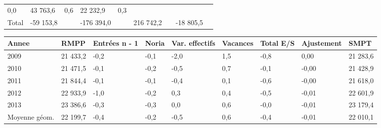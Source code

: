\begin{longtable}[]{@{}lllllllll@{}}
\begin{minipage}[t]{0.06\columnwidth}
0,0\strut
\end{minipage} & \begin{minipage}[t]{0.12\columnwidth}\raggedright
43 763,6\strut
\end{minipage} & \begin{minipage}[t]{0.06\columnwidth}\raggedright
0,6\strut
\end{minipage} & \begin{minipage}[t]{0.08\columnwidth}\raggedright
22 232,9\strut
\end{minipage} & \begin{minipage}[t]{0.06\columnwidth}\raggedright
0,3\strut
\end{minipage}\tabularnewline
\begin{minipage}[t]{0.05\columnwidth}\raggedright
Total\strut
\end{minipage} & \begin{minipage}[t]{0.10\columnwidth}\raggedright
-59 153,8\strut
\end{minipage} & \begin{minipage}[t]{0.06\columnwidth}\raggedright
\strut
\end{minipage} & \begin{minipage}[t]{0.17\columnwidth}\raggedright
-176 394,0\strut
\end{minipage} & \begin{minipage}[t]{0.06\columnwidth}\raggedright
\strut
\end{minipage} & \begin{minipage}[t]{0.12\columnwidth}\raggedright
216 742,2\strut
\end{minipage} & \begin{minipage}[t]{0.06\columnwidth}\raggedright
\strut
\end{minipage} & \begin{minipage}[t]{0.08\columnwidth}\raggedright
-18 805,5\strut
\end{minipage} & \begin{minipage}[t]{0.06\columnwidth}\raggedright
\strut
\end{minipage}\tabularnewline
\bottomrule
\end{longtable}

\begin{longtable}[]{@{}lllllllll@{}}
\toprule
Annee & RMPP & Entrées n - 1 & Noria & Var. effectifs & Vacances & Total
E/S & Ajustement & SMPT\tabularnewline
\midrule
\endhead
2009 & 21 433,2 & -0,2 & -0,1 & -2,0 & 1,5 & -0,8 & 0,00 & 21
283,6\tabularnewline
2010 & 21 471,5 & -0,1 & -0,2 & -0,5 & 0,7 & -0,1 & -0,00 & 21
428,9\tabularnewline
2011 & 21 844,4 & -0,1 & -0,1 & -0,4 & 0,1 & -0,6 & -0,00 & 21
618,0\tabularnewline
2012 & 22 933,9 & -1,0 & -0,2 & 0,3 & 0,4 & -0,5 & -0,01 & 22
601,9\tabularnewline
2013 & 23 386,6 & -0,3 & -0,3 & 0,0 & 0,6 & -0,0 & -0,01 & 23
179,4\tabularnewline
Moyenne géom. & 22 199,7 & -0,4 & -0,2 & -0,5 & 0,6 & -0,4 & -0,01 & 22
010,1\tabularnewline
\bottomrule
\end{longtable}

